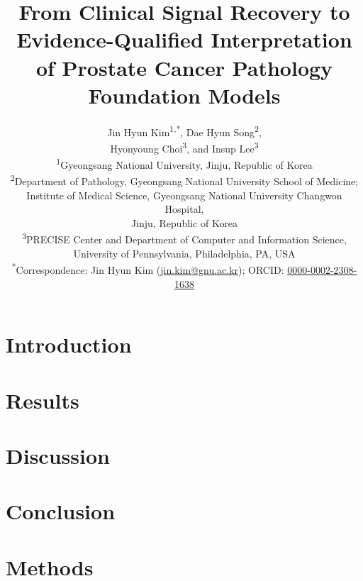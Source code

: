 \documentclass[11pt,a4paper]{article}
\title{From Clinical Signal Recovery to Evidence-Qualified Interpretation of Prostate Cancer
Pathology Foundation Models}
\author{Jin Hyun Kim\textsuperscript{1,*}, Dae Hyun Song\textsuperscript{2},\\
Hyonyoung Choi\textsuperscript{3}, and Insup Lee\textsuperscript{3}\\[0.6em]
\small \textsuperscript{1}Gyeongsang National University, Jinju, Republic of Korea\\
\small \textsuperscript{2}Department of Pathology, Gyeongsang National University School of Medicine;\\
\small Institute of Medical Science, Gyeongsang National University Changwon Hospital,\\
\small Jinju, Republic of Korea\\
\small \textsuperscript{3}PRECISE Center and Department of Computer and Information Science,\\
\small University of Pennsylvania, Philadelphia, PA, USA\\[0.4em]
\small \textsuperscript{*}Correspondence: Jin Hyun Kim
(\href{mailto:jin.kim@gnu.ac.kr}{jin.kim@gnu.ac.kr});
ORCID: \href{https://orcid.org/0000-0002-2308-1638}{0000-0002-2308-1638}}
\date{}
\begin{document}
\sloppy
\maketitle



\section{Introduction}


\section{Results}


\section{Discussion}


\section{Conclusion}


\section{Methods}





\end{document}
